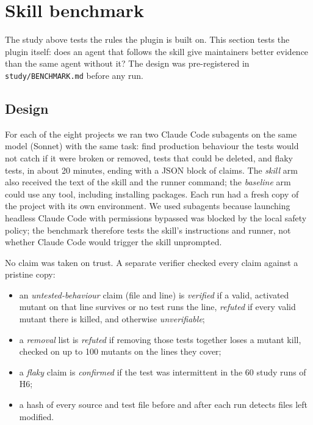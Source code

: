 \section{Skill benchmark}
\label{sec:benchmark}

The study above tests the rules the plugin is built on. This section tests the plugin itself: does an agent that follows the skill give maintainers better evidence than the same agent without it? The design was pre-registered in \texttt{study/BENCHMARK.md} before any run.

\subsection{Design}

For each of the eight projects we ran two Claude Code subagents on the same model (Sonnet) with the same task: find production behaviour the tests would not catch if it were broken or removed, tests that could be deleted, and flaky tests, in about 20 minutes, ending with a JSON block of claims. The \emph{skill} arm also received the text of the skill and the runner command; the \emph{baseline} arm could use any tool, including installing packages. Each run had a fresh copy of the project with its own environment. We used subagents because launching headless Claude Code with permissions bypassed was blocked by the local safety policy; the benchmark therefore tests the skill's instructions and runner, not whether Claude Code would trigger the skill unprompted.

No claim was taken on trust. A separate verifier checked every claim against a pristine copy:
\begin{itemize}
  \item an \emph{untested-behaviour} claim (file and line) is \emph{verified} if a valid, activated mutant on that line survives or no test runs the line, \emph{refuted} if every valid mutant there is killed, and otherwise \emph{unverifiable};
  \item a \emph{removal} list is \emph{refuted} if removing those tests together loses a mutant kill, checked on up to 100 mutants on the lines they cover;
  \item a \emph{flaky} claim is \emph{confirmed} if the test was intermittent in the 60 study runs of H6;
  \item a hash of every source and test file before and after each run detects files left modified.
\end{itemize}


